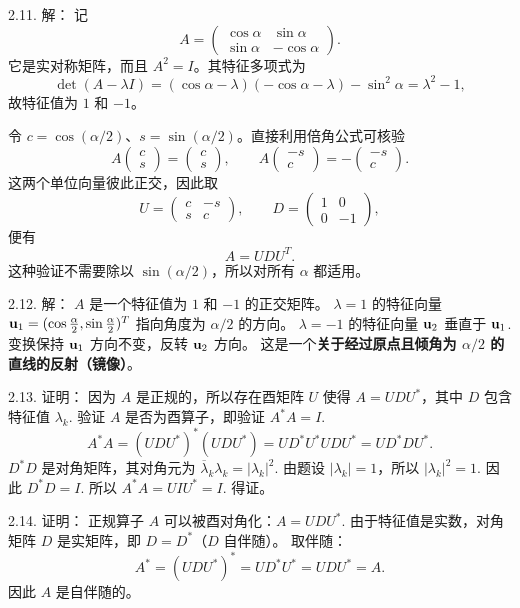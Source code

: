 \begin{exer}
2.11. 解：
记
$$
A=\begin{pmatrix}\cos\alpha&\sin\alpha\\ \sin\alpha&-\cos\alpha\end{pmatrix}.
$$
它是实对称矩阵，而且 $A^2=I$。其特征多项式为
$$
\det(A-\lambda I)
=(\cos\alpha-\lambda)(-\cos\alpha-\lambda)-\sin^2\alpha
=\lambda^2-1,
$$
故特征值为 $1$ 和 $-1$。

令 $c=\cos(\alpha/2)$、$s=\sin(\alpha/2)$。直接利用倍角公式可核验
$$
A\begin{pmatrix}c\\s\end{pmatrix}
=\begin{pmatrix}c\\s\end{pmatrix},\qquad
A\begin{pmatrix}-s\\c\end{pmatrix}
=-\begin{pmatrix}-s\\c\end{pmatrix}.
$$
这两个单位向量彼此正交，因此取
$$
U=\begin{pmatrix}c&-s\\s&c\end{pmatrix},\qquad
D=\begin{pmatrix}1&0\\0&-1\end{pmatrix},
$$
便有
$$A=UDU^T.$$
这种验证不需要除以 $\sin(\alpha/2)$，所以对所有 $\alpha$ 都适用。

2.12. 解：
$A$ 是一个特征值为 $1$ 和 $-1$ 的正交矩阵。
$\lambda=1$ 的特征向量 $\mathbf{u}_1 = (\cos\frac{\alpha}{2}, \sin\frac{\alpha}{2})^T$ 指向角度为 $\alpha/2$ 的方向。
$\lambda=-1$ 的特征向量 $\mathbf{u}_2$ 垂直于 $\mathbf{u}_1$.
变换保持 $\mathbf{u}_1$ 方向不变，反转 $\mathbf{u}_2$ 方向。
这是一个\textbf{关于经过原点且倾角为 $\alpha/2$ 的直线的反射（镜像）}。

2.13. 证明：
因为 $A$ 是正规的，所以存在酉矩阵 $U$ 使得 $A = UDU^*$，其中 $D$ 包含特征值 $\lambda_k$.
验证 $A$ 是否为酉算子，即验证 $A^*A = I$.
$$ A^*A = (UDU^*)^* (UDU^*) = U D^* U^* U D U^* = U D^* D U^*. $$
$D^* D$ 是对角矩阵，其对角元为 $\overline{\lambda}_k \lambda_k = |\lambda_k|^2$.
由题设 $|\lambda_k| = 1$，所以 $|\lambda_k|^2 = 1$.
因此 $D^* D = I$.
所以 $A^*A = U I U^* = I$. 得证。

2.14. 证明：
正规算子 $A$ 可以被酉对角化：$A = UDU^*$.
由于特征值是实数，对角矩阵 $D$ 是实矩阵，即 $D = D^*$（$D$ 自伴随）。
取伴随：
$$ A^* = (UDU^*)^* = U D^* U^* = U D U^* = A. $$
因此 $A$ 是自伴随的。


\end{exer}

